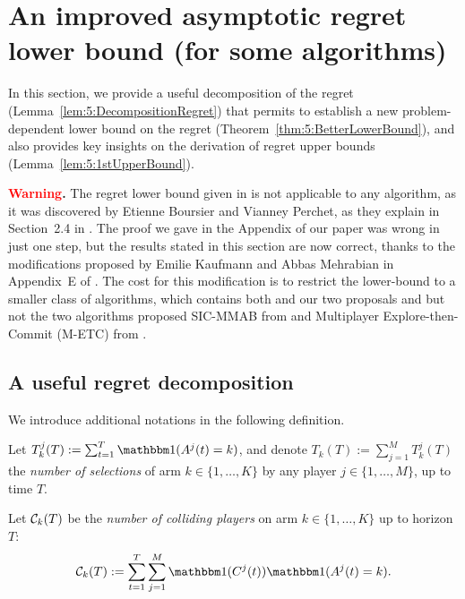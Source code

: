 \section{An improved asymptotic regret lower bound (for some algorithms)}
\label{sec:5:lowerbound}

In this section, we provide a useful decomposition of the regret (Lemma~\ref{lem:5:DecompositionRegret}) that permits to establish a new problem-dependent lower bound on the regret (Theorem~\ref{thm:5:BetterLowerBound}), and also provides key insights on the derivation of regret upper bounds (Lemma~\ref{lem:5:1stUpperBound}).

\begin{framed}
  \textbf{\textcolor{red}{Warning}.}
  The regret lower bound given in \cite{Besson2018ALT} is not applicable to any algorithm,
  as it was discovered by Etienne Boursier and Vianney Perchet, as they explain in Section~2.4 in \cite{BoursierPerchet18}.
  The proof we gave in the Appendix of our paper \cite{Besson2018ALT} was wrong in just one step,
  but the results stated in this section are now correct,
  thanks to the modifications proposed by Emilie Kaufmann and Abbas Mehrabian in Appendix~E of \cite{KaufmannAbbas19}.
  The cost for this modification is to restrict the lower-bound to a smaller class of algorithms, which contains both \RhoRand{} and our two proposals \RandTopM{} and \MCTopM{} but not the two algorithms proposed SIC-MMAB from \cite{BoursierPerchet18} and Multiplayer Explore-then-Commit (M-ETC) from \cite{KaufmannAbbas19}.
\end{framed}


\subsection{A useful regret decomposition}
\label{sub:5:defregret}

We introduce additional notations in the following definition.

\begin{definition}
  \label{def:5:nbSelections_nbCollisions}
  Let $T^j_k(T) := \sum_{t=1}^T \indic(A^j(t) = k)$,
  and denote $T_k(T) := \sum_{j=1}^M T^j_k(T)$ the \emph{number of selections} of arm $k\in\{1,\dots,K\}$ by any player $j\in\{1,\dots,M\}$, up to time $T$.

  Let $\mathcal{C}_k(T)$ be the \emph{number of colliding players} on arm $k\in\{1,\dots,K\}$ up to horizon $T$:
  \begin{equation}
    \cC_k(T) :=
    \sum_{t=1}^{T} \sum_{j=1}^{M} \indic(C^j(t)) \indic(A^j(t) = k).
  \end{equation}
\end{definition}

